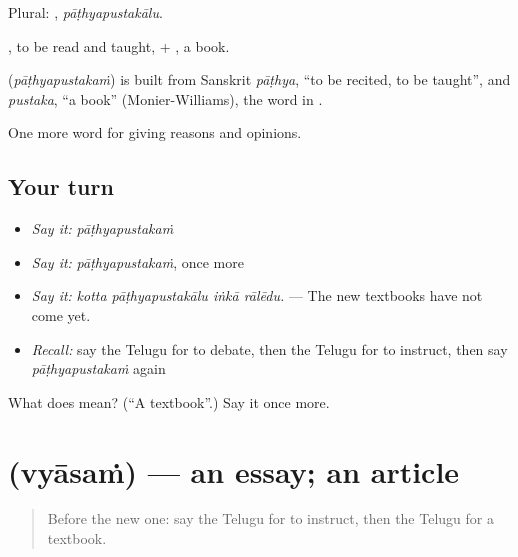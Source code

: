 Plural: , \emph{pāṭhyapustakālu}.

, to be read and taught, + , a book.

\begin{cousinweb}
\textbf{} (\emph{pāṭhyapustakaṁ}) is built from Sanskrit \emph{pāṭhya}, \textquotedblleft{}to be recited, to be taught\textquotedblright{}, and \emph{pustaka}, \textquotedblleft{}a book\textquotedblright{} (Monier-Williams), the word in .
\end{cousinweb}

\begin{grammarlens}[title={What you've built}]
One more word for giving reasons and opinions.
\end{grammarlens}

\subsection*{Your turn}
\begin{itemize}
\raggedright
  \item \emph{Say it:} \emph{pāṭhyapustakaṁ}
  \item \emph{Say it:} \emph{pāṭhyapustakaṁ}, once more
  \item \emph{Say it:} \emph{kotta pāṭhyapustakālu iṅkā rālēdu.} — The new textbooks have not come yet.
  \item \emph{Recall:} say the Telugu for to debate, then the Telugu for to instruct, then say \emph{pāṭhyapustakaṁ} again
\end{itemize}

\begin{tcolorbox}[breakable,colback=teal!4,colframe=teal!35!black,title={Before you move on}]
What does  mean? (\textquotedblleft{}A textbook\textquotedblright{}.) Say it once more.
\end{tcolorbox}
\section[\texorpdfstring{\te{వ్యాసం} (vyāsaṁ)}{వ్యాసం (vyāsaṁ)}]{ (vyāsaṁ) — an essay; an article}

\label{lesson:TE-C416-vyasam}



\begin{quote}
Before the new one: say the Telugu for to instruct, then the Telugu for a textbook.
\end{quote}

